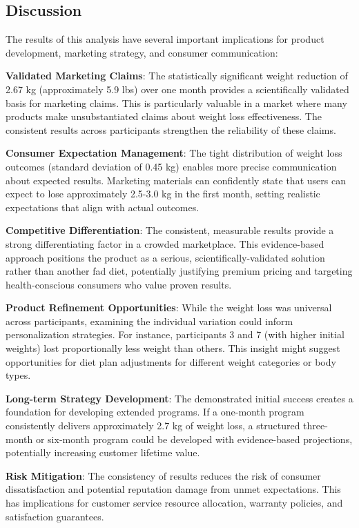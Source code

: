\documentclass[12pt]{article}
\begin{document}
\subsection{Discussion}
The results of this analysis have several important implications for product development, marketing strategy, and consumer communication:

\textbf{Validated Marketing Claims}: The statistically significant weight reduction of 2.67 kg (approximately 5.9 lbs) over one month provides a scientifically validated basis for marketing claims. This is particularly valuable in a market where many products make unsubstantiated claims about weight loss effectiveness. The consistent results across participants strengthen the reliability of these claims.

\textbf{Consumer Expectation Management}: The tight distribution of weight loss outcomes (standard deviation of 0.45 kg) enables more precise communication about expected results. Marketing materials can confidently state that users can expect to lose approximately 2.5-3.0 kg in the first month, setting realistic expectations that align with actual outcomes.

\textbf{Competitive Differentiation}: The consistent, measurable results provide a strong differentiating factor in a crowded marketplace. This evidence-based approach positions the product as a serious, scientifically-validated solution rather than another fad diet, potentially justifying premium pricing and targeting health-conscious consumers who value proven results.

\textbf{Product Refinement Opportunities}: While the weight loss was universal across participants, examining the individual variation could inform personalization strategies. For instance, participants 3 and 7 (with higher initial weights) lost proportionally less weight than others. This insight might suggest opportunities for diet plan adjustments for different weight categories or body types.

\textbf{Long-term Strategy Development}: The demonstrated initial success creates a foundation for developing extended programs. If a one-month program consistently delivers approximately 2.7 kg of weight loss, a structured three-month or six-month program could be developed with evidence-based projections, potentially increasing customer lifetime value.

\textbf{Risk Mitigation}: The consistency of results reduces the risk of consumer dissatisfaction and potential reputation damage from unmet expectations. This has implications for customer service resource allocation, warranty policies, and satisfaction guarantees.
\end{document}
